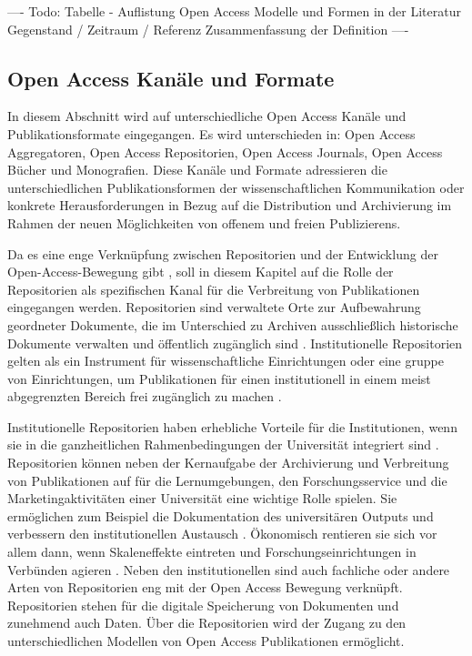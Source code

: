 ---- Todo: Tabelle - Auflistung Open Access  Modelle und Formen in der Literatur
Gegenstand / Zeitraum / Referenz
Zusammenfassung der Definition ----

\subsection{Open Access Kanäle und Formate}
In diesem Abschnitt wird auf unterschiedliche Open Access Kanäle und Publikationsformate eingegangen. Es wird unterschieden in: Open Access Aggregatoren, Open Access Repositorien, Open Access Journals, Open Access Bücher und Monografien. Diese Kanäle und Formate adressieren die unterschiedlichen Publikationsformen der wissenschaftlichen Kommunikation oder konkrete Herausforderungen in Bezug auf die Distribution und Archivierung im Rahmen der neuen Möglichkeiten von offenem und freien Publizierens.

Da es eine enge Verknüpfung zwischen Repositorien und der Entwicklung der Open-Access-Bewegung gibt \cite{offhaus_2012_institutionelle_repos}, soll in diesem Kapitel auf die Rolle der Repositorien als spezifischen Kanal für die Verbreitung von Publikationen eingegangen werden. Repositorien sind verwaltete Orte zur Aufbewahrung geordneter Dokumente, die im Unterschied zu Archiven ausschließlich historische Dokumente verwalten und öffentlich zugänglich sind \cite{suchen}. Institutionelle Repositorien gelten als ein Instrument für wissenschaftliche Einrichtungen oder eine gruppe von Einrichtungen, um Publikationen für einen institutionell in einem meist abgegrenzten Bereich frei zugänglich zu machen \cite{dobratz_2007_open} \cite{Baggs_2006}.

Institutionelle Repositorien haben erhebliche Vorteile für die Institutionen, wenn sie in die ganzheitlichen Rahmenbedingungen der Universität integriert sind \cite{steele_2006}. Repositorien können neben der Kernaufgabe der Archivierung und Verbreitung von Publikationen auf für die Lernumgebungen, den Forschungsservice und die Marketingaktivitäten einer Universität eine wichtige Rolle spielen. Sie ermöglichen zum Beispiel die Dokumentation des universitären Outputs und verbessern den institutionellen Austausch \cite{steele_2006}. Ökonomisch rentieren sie sich vor allem dann, wenn Skaleneffekte eintreten und Forschungseinrichtungen in Verbünden agieren \cite{blythe_2005value}. Neben den institutionellen sind auch fachliche oder andere Arten von Repositorien eng mit der Open Access Bewegung verknüpft. Repositorien stehen  für die digitale Speicherung von Dokumenten und zunehmend auch Daten. Über die Repositorien wird der Zugang zu den unterschiedlichen Modellen von Open Access Publikationen ermöglicht.

